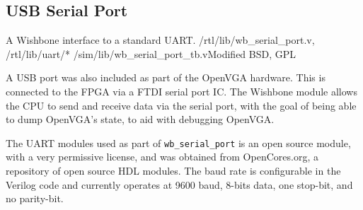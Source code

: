 

\subsection{USB Serial Port}
\label{USB_Sport}

{A Wishbone interface to a standard UART.} {/rtl/lib/wb\_serial\_port.v,
/rtl/lib/uart/*} {/sim/lib/wb\_serial\_port\_tb.v}{Modified BSD, GPL}

A USB port was also included as part of the OpenVGA hardware. This is connected
to the FPGA via a FTDI serial port IC. The Wishbone module allows the CPU to send
and receive data via the serial port, with the goal of being able to dump
OpenVGA's state, to aid with debugging OpenVGA.

The UART modules used as part of \texttt{wb\_serial\_port} is an open source
module, with a very permissive license, and was obtained from OpenCores.org, a
repository of open source HDL modules. The baud rate is configurable in the
Verilog code and currently operates at 9600 baud, 8-bits data, one stop-bit, and
no parity-bit.
